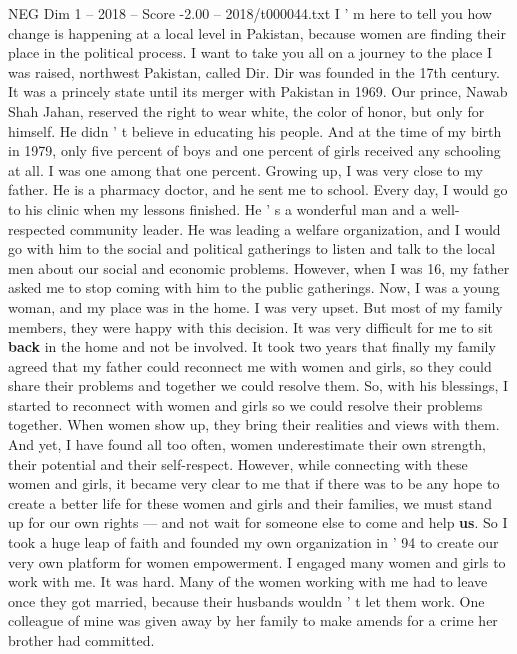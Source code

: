 \begin{textsample}{NEG Dim 1 – 2018 – Score -2.00 – 2018/t000044.txt}  \label{ex:f1_neg_013}
I ' m here to tell you how change is happening at a local level in Pakistan, because women are finding their place in the political process.
I want to take you all on a journey to the place I was raised, northwest Pakistan, called Dir.
Dir was founded in the 17th century.
It was a princely state until its merger with Pakistan in 1969.
Our prince, Nawab Shah Jahan, reserved the right to wear white, the color of honor, but only for himself.
He didn ' t believe in educating his people.
And at the time of my birth in 1979, only five percent of boys and one percent of girls received any schooling at all.
I was one among that one percent.
Growing up, I was very close to my father.
He is a pharmacy doctor, and he sent me to school.
Every day, I would go to his clinic when my lessons finished.
He ' s a wonderful man and a well-respected community leader.
He was leading a welfare organization, and I would go with him to the social and political gatherings to listen and talk to the local men about our social and economic problems.
However, when I was 16, my father asked me to stop coming with him to the public gatherings.
Now, I was a young woman, and my place was in the home.
I was very upset.
But most of my family members, they were happy with this decision.
It was very difficult for me to sit \textbf{back} in the home and not be involved.
It took two years that finally my family agreed that my father could reconnect me with women and girls, so they could share their problems and together we could resolve them.
So, with his blessings, I started to reconnect with women and girls so we could resolve their problems together.
When women show up, they bring their realities and views with them.
And yet, I have found all too often, women underestimate their own strength, their potential and their self-respect.
However, while connecting with these women and girls, it became very clear to me that if there was to be any hope to create a better life for these women and girls and their families, we must stand up for our own rights — and not wait for someone else to come and help \textbf{us}.
So I took a huge leap of faith and founded my own organization in ' 94 to create our very own platform for women empowerment.
I engaged many women and girls to work with me.
It was hard.
Many of the women working with me had to leave once they got married, because their husbands wouldn ' t let them work.
One colleague of mine was given away by her family to make amends for a crime her brother had committed.

\end{textsample}
